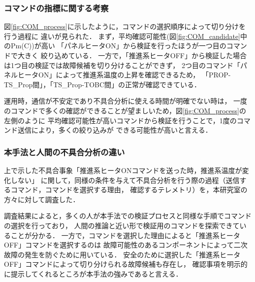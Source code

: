 \documentclass[11pt]{jsarticle}%
\begin{document}
\begin{multicols}{2}
\subsubsection{コマンドの指標に関する考察}
図\ref{fig:COM_process}に示したように，コマンドの選択順序によって切り分けを行う過程に
違いが見られた．
まず，平均確認可能性(図\ref{fig:COM_candidate}中のPm(C))が高い
「パネルヒータON」から検証を行ったほうが一つ目のコマンドで大きく
絞り込めている．
一方で，「推進系ヒータOFF」から検証した場合は1つ目の検証では故障候補を切り分けることができず，
2つ目のコマンド「パネルヒータON」によって推進系温度の上昇を確認できるため，
「PROP-TS\_Prop間」，「TS\_Prop-TOBC間」の正常が確認できている．

運用時，通信が不安定であり不具合分析に使える時間が明確でない時は，
一度のコマンドで多くの確認ができることが望ましいため，図\ref{fig:COM_process}の左側のように
平均確認可能性が高いコマンドから検証を行うことで，1度のコマンド送信により，多くの絞り込みが
できる可能性が高いと言える．
\vspace{-1zh}
\subsubsection{本手法と人間の不具合分析の違い}
上で示した不具合事象「推進系ヒータONコマンドを送った時，推進系温度が変化しない」
に関して，同様の条件を与えて不具合分析を行う際の過程（送信するコマンド，コマンドを選択する理由，
確認するテレメトリ）を，本研究室の方々に対して調査した．%

調査結果によると，多くの人が本手法での検証プロセスと同様な手順でコマンドの選択を行っており，
人間の推論と近い形で検証用のコマンドを探索できていることが分かる．
一方で，コマンドを選択した理由によると「推進系ヒータOFF」コマンドを選択するのは
故障可能性のあるコンポーネントによって二次故障の発生を防ぐために用いている．
安全のために選択した「推進系ヒータOFF」コマンドによって切り分けられる故障候補も存在し，
確認事項を明示的に提示してくれるところが本手法の強みであると言える．
\vspace{-1zh}

\end{multicols}
\end{document}
